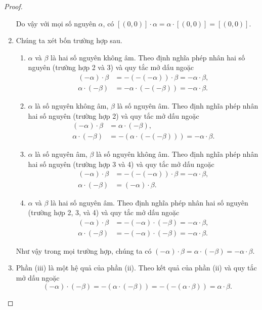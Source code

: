 \begin{proof}
\begin{enumerate}[label={(\roman*)}]
		      Do vậy với mọi số nguyên $\alpha$, có $[(0, 0)]\cdot\alpha = \alpha\cdot[(0,0)] = [(0,0)]$.
		\item Chúng ta xét bốn trường hợp sau.
		      \begin{enumerate}[label={\textbf{Trường hợp \arabic*.}},itemindent=1.5cm]
			      \item $\alpha$ và $\beta$ là hai số nguyên không âm. Theo định nghĩa phép nhân hai số nguyên (trường hợp 2 và 3) và quy tắc mở dấu ngoặc
			            \begin{align*}
				            (-\alpha)\cdot\beta & = -(-(-\alpha))\cdot \beta = -\alpha\cdot\beta, \\
				            \alpha\cdot(-\beta) & = -\alpha\cdot (-(-\beta)) = -\alpha\cdot\beta.
			            \end{align*}
			      \item $\alpha$ là số nguyên không âm, $\beta$ là số nguyên âm. Theo định nghĩa phép nhân hai số nguyên (trường hợp 2) và quy tắc mở dấu ngoặc
			            \begin{align*}
				            (-\alpha)\cdot\beta  & = \alpha\cdot (-\beta),                          \\
				            \alpha\cdot (-\beta) & = -(\alpha\cdot(-(-\beta))) = -\alpha\cdot\beta.
			            \end{align*}
			      \item $\alpha$ là số nguyên âm, $\beta$ là số nguyên không âm. Theo định nghĩa phép nhân hai số nguyên (trường hợp 3 và 4) và quy tắc mở dấu ngoặc
			            \begin{align*}
				            (-\alpha)\cdot\beta & = -(-(-\alpha))\cdot\beta = -\alpha\cdot\beta, \\
				            \alpha\cdot(-\beta) & = (-\alpha)\cdot\beta.
			            \end{align*}
			      \item $\alpha$ và $\beta$ là hai số nguyên âm. Theo định nghĩa phép nhân hai số nguyên (trường hợp 2, 3, và 4) và quy tắc mở dấu ngoặc
			            \begin{align*}
				            (-\alpha)\cdot\beta & = -(-\alpha)\cdot(-\beta) = -\alpha\cdot\beta, \\
				            \alpha\cdot(-\beta) & = -(-\alpha)\cdot(-\beta) = -\alpha\cdot\beta.
			            \end{align*}
		      \end{enumerate}

		      Như vậy trong mọi trường hợp, chúng ta có $(-\alpha)\cdot\beta = \alpha\cdot(-\beta) = -\alpha\cdot\beta$.
		\item Phần (iii) là một hệ quả của phần (ii). Theo kết quả của phần (ii) và quy tắc mở dấu ngoặc
		      \[
			      (-\alpha)\cdot (-\beta) = -(\alpha\cdot(-\beta)) = -(-(\alpha\cdot\beta)) = \alpha\cdot\beta.
		      \]
	\end{enumerate}
\end{proof}

